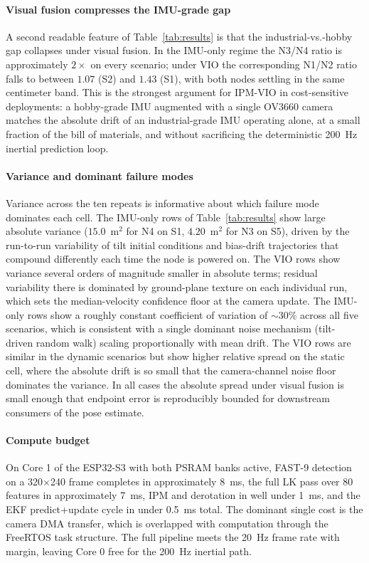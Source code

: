 \documentclass[conference]{IEEEtran}
\begin{document}
\paragraph*{Visual fusion compresses the IMU-grade gap}
A second readable feature of Table~\ref{tab:results} is that the
industrial-vs.-hobby gap collapses under visual fusion. In the
IMU-only regime the N3/N4 ratio is approximately $2\times$ on every
scenario; under VIO the corresponding N1/N2 ratio falls to between
$1.07$ (S2) and $1.43$ (S1), with both nodes settling in the same
centimeter band. This is the strongest argument for IPM-VIO in
cost-sensitive deployments: a hobby-grade IMU augmented with a
single OV3660 camera matches the absolute drift of an industrial-grade
IMU operating alone, at a small fraction of the bill of materials,
and without sacrificing the deterministic 200~Hz inertial prediction
loop.

\paragraph*{Variance and dominant failure modes}
Variance across the ten repeats is informative about which failure
mode dominates each cell. The IMU-only rows of Table~\ref{tab:results}
show large absolute variance ($15.0$~m$^{2}$ for N4 on S1,
$4.20$~m$^{2}$ for N3 on S5), driven by the run-to-run variability of
tilt initial conditions and bias-drift trajectories that compound
differently each time the node is powered on. The VIO rows show
variance several orders of magnitude smaller in absolute terms;
residual variability there is dominated by ground-plane texture on
each individual run, which sets the median-velocity confidence floor
at the camera update. The IMU-only rows show a roughly constant
coefficient of variation of $\sim\!30\%$ across all five scenarios,
which is consistent with a single dominant noise mechanism (tilt-
driven random walk) scaling proportionally with mean drift. The VIO
rows are similar in the dynamic scenarios but show higher relative
spread on the static cell, where the absolute drift is so small that
the camera-channel noise floor dominates the variance. In all cases
the absolute spread under visual fusion is small enough that endpoint
error is reproducibly bounded for downstream consumers of the pose
estimate.

\paragraph*{Compute budget}
On Core 1 of the ESP32-S3 with both PSRAM banks active, FAST-9
detection on a 320$\times$240 frame completes in approximately
8~ms, the full LK pass over 80 features in approximately 7~ms,
IPM and derotation in well under 1~ms, and the EKF predict+update
cycle in under 0.5~ms total.  The dominant single cost is the
camera DMA transfer, which is overlapped with computation through
the FreeRTOS task structure.  The full pipeline meets the 20~Hz
frame rate with margin, leaving Core 0 free for the 200~Hz inertial
path.
\end{document}
